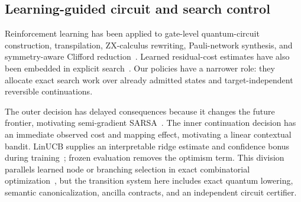 \subsection{Learning-guided circuit and search control}
Reinforcement learning has been applied to gate-level quantum-circuit construction, transpilation, ZX-calculus rewriting, Pauli-network synthesis, and symmetry-aware Clifford reduction~\cite{kolle2024environment,kremer2024practical,riu2023zx,dubal2025pauli,yeung2026equivariant}.  Learned residual-cost estimates have also been embedded in explicit search~\cite{theissinger2026beyond}.  Our policies have a narrower role: they allocate exact search work over already admitted states and target-independent reversible continuations.

The outer decision has delayed consequences because it changes the future frontier, motivating semi-gradient SARSA~\cite{sutton2018rl}.  The inner continuation decision has an immediate observed cost and mapping effect, motivating a linear contextual bandit.  LinUCB supplies an interpretable ridge estimate and confidence bonus during training~\cite{li2010contextual,abbasiyadkori2011improved}; frozen evaluation removes the optimism term.  This division parallels learned node or branching selection in exact combinatorial optimization~\cite{mattick2023node}, but the transition system here includes exact quantum lowering, semantic canonicalization, ancilla contracts, and an independent circuit certifier.

